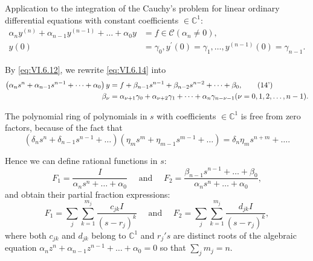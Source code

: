 Application to the integration of the Cauchy's problem for linear ordinary differential equations with constant coefficients $\in \mathbb{C}^{1}$: 
\begin{equation}\label{eq:VI.6.14}
\begin{aligned}
\alpha_{n} y ^{(n)} + \alpha_{n-1} y ^{(n-1)} + \ldots + \alpha_{0} y &= f \in \mathcal {C} (\alpha_{n} \neq 0),
\\
y (0) &= \gamma_{0}, y ^{\prime} (0) = \gamma_{1}, \ldots , y ^{(n-1)} (0) = \gamma_{n-1}.
\end{aligned}
\end{equation}

By \eqref{eq:VI.6.12}, we rewrite \eqref{eq:VI.6.14} into 
\begin{align}
\left(\alpha_{n} s ^{n} + \alpha_{n-1} s ^{n-1} + \dots + \alpha_{0}\right) y& = f + \beta_{n-1} s ^{n-1} + \beta_{n-2} s ^{n-2} + \dots + \beta_{0}, \tag{14'}\label{eq:VI.6.14'} \\
\beta_{\nu}& = \alpha_{\nu +1} \gamma_{0} + \alpha_{\nu +2} \gamma_{1} + \dots + \alpha_{n} \gamma_{n - \nu -1} (\nu = 0, 1, 2, \dots , n - 1). \notag
\end{align}

The polynomial ring of polynomials in $s$ with coefficients $\in \mathbb{C}^{1}$ is free from zero factors, because of the fact that 
\[
\left(\delta_{n} s ^{n} + \delta_{n-1} s ^{n-1} + \dots\right) \left(\eta_{m} s ^{m} + \eta_{m-1} s ^{m-1} + \dots\right) = \delta_{n} \eta_{m} s ^{n+m} + \dots .
\]

Hence we can define rational functions in $s$: 
\begin{equation}\label{eq:VI.6.15}
F _{1} = \frac {I}{\alpha_{n} s ^{n} + \dots + \alpha_{0}} \quad \text{ and } \quad F _{2} = \frac {\beta_{n-1} s ^{n-1} + \dots + \beta_{0}}{\alpha_{n} s ^{n} + \dots + \alpha_{0}},
\end{equation}
and obtain their partial fraction expressions: 
\begin{equation}\tag{15'}\label{eq:VI.6.15'}
F _{1} = \sum\limits_{j} \sum\limits_{k=1} ^ {m _{j}} \frac {c _{jk} I}{(s - r _{j}) ^{k}} \quad \text{ and } \quad F _{2} = \sum\limits_{j} \sum\limits_{k=1} ^ {m _{j}} \frac {d _{jk} I}{(s - r _{j}) ^{k}},
\end{equation}
where both $c_{jk}$ and $d_{jk}$ belong to $\mathbb{C}^{1}$ and $r_j's$ are distinct roots of the algebraic equation $\alpha_n z^n + \alpha_{n-1} z^{n-1} + \ldots + \alpha_0 = 0$ so that $\sum\limits_{j} m_j = n$. 

